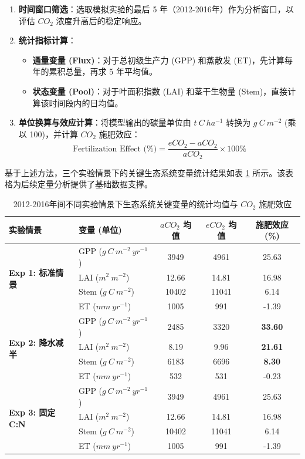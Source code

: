 \documentclass[10pt]{config}
\begin{document}
\begin{enumerate}
    \item \textbf{时间窗口筛选}：选取模拟实验的最后 5 年（2012-2016年）作为分析窗口，以评估 $CO_2$ 浓度升高后的稳定响应。
    \item \textbf{统计指标计算}：
    \begin{itemize}
        \item \textbf{通量变量 (Flux)}：对于总初级生产力 (GPP) 和蒸散发 (ET)，先计算每年的累积总量，再求 5 年平均值。
        \item \textbf{状态变量 (Pool)}：对于叶面积指数 (LAI) 和茎干生物量 (Stem)，直接计算该时间段内的日均值。
    \end{itemize}
    \item \textbf{单位换算与效应计算}：将模型输出的碳量单位由 $t~C~ha^{-1}$ 转换为 $g~C~m^{-2}$ (乘以 100)，并计算 $CO_2$ 施肥效应：
    $$ \text{Fertilization Effect (\%)} = \frac{eCO_2 - aCO_2}{aCO_2} \times 100\% $$
\end{enumerate}

基于上述方法，三个实验情景下的关键生态系统变量统计结果如表 \ref{tab:summary_stats} 所示。该表格为后续定量分析提供了基础数据支撑。

\begin{table}[h]
    \centering
    \caption{2012-2016年间不同实验情景下生态系统关键变量的统计均值与 $CO_2$ 施肥效应}
    \small
    \renewcommand{\arraystretch}{1.3}
    \begin{tabular}{l l c c c}
        \toprule
        \textbf{实验情景} & \textbf{变量 (单位)} & \textbf{$aCO_2$ 均值} & \textbf{$eCO_2$ 均值} & \textbf{施肥效应 (\%)} \\
        \midrule
        \multirow{4}{*}{\textbf{Exp 1: 标准情景}} 
          & GPP ($g~C~m^{-2}~yr^{-1}$) & 3949 & 4961 & 25.63 \\
          & LAI ($m^2~m^{-2}$) & 12.66 & 14.81 & 16.98 \\
          & Stem ($g~C~m^{-2}$) & 10402 & 11041 & 6.14 \\
          & ET ($mm~yr^{-1}$) & 1005 & 991 & -1.39 \\
        \midrule
        \multirow{4}{*}{\textbf{Exp 2: 降水减半}} 
          & GPP ($g~C~m^{-2}~yr^{-1}$) & 2485 & 3320 & \textbf{33.60} \\
          & LAI ($m^2~m^{-2}$) & 8.19 & 9.96 & \textbf{21.61} \\
          & Stem ($g~C~m^{-2}$) & 6183 & 6696 & \textbf{8.30} \\
          & ET ($mm~yr^{-1}$) & 532 & 531 & -0.23 \\
        \midrule
        \multirow{4}{*}{\textbf{Exp 3: 固定 C:N}} 
          & GPP ($g~C~m^{-2}~yr^{-1}$) & 3949 & 4961 & 25.63 \\
          & LAI ($m^2~m^{-2}$) & 12.66 & 14.81 & 16.98 \\
          & Stem ($g~C~m^{-2}$) & 10402 & 11041 & 6.14 \\
          & ET ($mm~yr^{-1}$) & 1005 & 991 & -1.39 \\
        \bottomrule
    \end{tabular}
   \label{tab:summary_stats}
\end{table}
\end{document}
